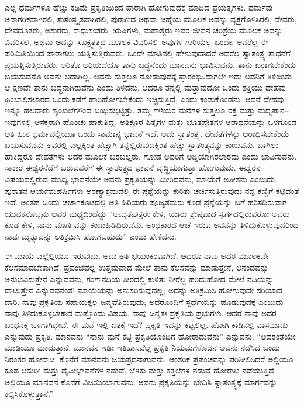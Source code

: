 \vskip 2pt

ಎಲ್ಲ ಧರ್ಮಗಳೂ ಹೆಚ್ಚು ಕಡಿಮೆ ಪ್ರಕೃತಿಯಿಂದ ಪಾರಾಗಿ ಹೋಗುವುದಕ್ಕೆ ಮಾಡಿದ ಪ್ರಯತ್ನಗಳು. ಧರ್ಮವು ಅನಾಗರಿಕವಾಗಿರಲಿ, ಸುಸಂಸ್ಕೃತವಾಗಿರಲಿ, ಪುರಾಣದ ಅಥವಾ ಚಿಹ್ನೆಯ ಮೂಲಕ ಅದನ್ನು ವ್ಯಕ್ತಗೊಳಿಸಿರಲಿ, ದೇವರು, ದೇವದೂತರು, ಅಸುರರು, ಸಾಧುಸಂತರು, ಋಷಿಗಳು, ಮಹಾತ್ಮರು ಇವರ ಜೀವನ ಚರಿತ್ರೆಯ ಮೂಲಕ ಅದನ್ನು ವಿವರಿಸಲಿ, ಅಥವಾ ಅದನ್ನು ಸೂಕ್ಷ್ಮತತ್ತ್ವದ ಮೂಲಕ ವಿವರಿಸಲಿ–ಅವುಗಳ ಗುರಿಯೆಲ್ಲ ಒಂದೇ. ಅವರೆಲ್ಲ ಈ ಪರಿಮಿತಿಯಿಂದ ಪಾರಾಗಲು ಯತ್ನಿಸುತ್ತಿರುವರು. ಒಂದೇ ಮಾತಿನಲ್ಲಿ ಹೇಳುವುದಾದರೆ ಅವರೆಲ್ಲ ಸ್ವಾತಂತ್ರ್ಯ ಸಾಧನೆಗೆ ಪ್ರಯತ್ನಿಸುತ್ತಿರುವರು. ಅರಿತೊ ಅರಿಯದೆಯೊ ತಾನು ಬದ್ಧನೆಂದು ಮಾನವನು ಭಾವಿಸುವನು. ತಾನು ಏನಾಗಬೇಕೆಂದು ಬಯಸುವನೊ ಅವನು ಅದಾಗಿಲ್ಲ. ಅವನು ಸುತ್ತಲೂ ನೋಡುವುದಕ್ಕೆ ಪ್ರಾರಂಭಿಸಿದಾಗಲೇ ಇದು ಅವನಿಗೆ ತಿಳಿಯಿತು. ಆ ಕ್ಷಣವೇ ತಾನು ಬದ್ಧನಾಗಿರುವೆನು ಎಂದು ತಿಳಿದನು. ಆದರೂ ತನ್ನಲ್ಲಿ ಮತ್ತಾವುದೋ ಒಂದು ಶಕ್ತಿಯು ದೇಹವು ಹಿಂಬಾಲಿಸಲಾರದ ಒಂದು ಕಡೆಗೆ ಹಾರಿಹೋಗಬೇಕೆಂದು ಇಚ್ಛಿಸುತ್ತಿದೆ, ಎಂದು ಕಂಡುಕೊಂಡನು. ಆದರೆ ದೇಹವು ಇನ್ನೂ ಹಲವಾರು ಶೃಂಖಲೆಗಳಿಂದ ಬಂಧಿಸಲ್ಪಟ್ಟಿತ್ತು. ತಮ್ಮ ಗೆಳೆಯರ ಮನೆಗಳ ಸುತ್ತಲೂ ರಕ್ತ ಮತ್ತು ಮದ್ಯಪಾನ–ಇವುಗಳಲ್ಲಿ ಆಸಕ್ತರಾಗಿ ಹೊಂಚು ಹಾಕುತ್ತಿದ್ದ, ಅತಿಕ್ರೂರ ಪಿತೃಗಳ ಮತ್ತು ಭೂತಪ್ರೇತಗಳ ಆರಾಧನೆಯನ್ನು ಒಳಗೊಂಡ ಅತಿ ಹೀನ ಧರ್ಮದಲ್ಲಿಯೂ ಒಂದು ಸಾಮಾನ್ಯ ಭಾವನೆ ಇದೆ. ಅದು ಸ್ವಾತಂತ್ರ್ಯ. ದೇವತೆಗಳನ್ನು ಆರಾಧಿಸಬೇಕೆಂದು ಬಯಸುವವನು ಅವರಲ್ಲಿ ಎಲ್ಲಕ್ಕಿಂತ ಹೆಚ್ಚಾಗಿ ತನ್ನಲ್ಲಿರುವುದಕ್ಕಿಂತ ಹೆಚ್ಚು ಸ್ವಾತಂತ್ರ್ಯವನ್ನು ಕಾಣುವನು. ಬಾಗಿಲು ಹಾಕಿದ್ದರೂ ದೇವತೆಗಳು ಅದರ ಮೂಲಕ ಬರಬಲ್ಲರು, ಗೋಡೆ ಅವರಿಗೆ ಅಡ್ಡಿಯಾಗಿರಲಾರದು ಎಂದು ಭಾವಿಸುವನು. ಸಾಕಾರ ಈಶ್ವರನೆಡೆಗೆ ಬರುವವರೆಗೆ ಈ ಸ್ವಾತಂತ್ರ್ಯದ ಭಾವನೆ ವೃದ್ಧಿಯಾಗುತ್ತಾ ಹೋಗುವುದು. ಈಶ್ವರನ ವಿಷಯದಲ್ಲಿರುವ ಮುಖ್ಯ ಭಾವನೆಯೇ ಅವನು ಪ್ರಕೃತಿಯನ್ನು ಮೀರಿದವನು, ಮಾಯೆಗೆ ಅತೀತನು ಎಂಬುದು. ಪುರಾತನ ಆರ್ಯಮಹರ್ಷಿಗಳು ಅರಣ್ಯಾಶ್ರಮದಲ್ಲಿ ಈ ಪ್ರಶ್ನೆಯನ್ನು ಕುರಿತು ಚರ್ಚಿಸುತ್ತಿರುವುದು ನನ್ನ ಕಣ್ಣಿಗೆ ಕಟ್ಟಿದಂತೆ ಇದೆ. ಅಂತಹ ಒಂದು ಚರ್ಚಾಕೂಟದಲ್ಲಿ ಅತಿ ಹಿರಿಯರು ಪೂಜ್ಯತಮರು ಕೂಡ ಪ್ರಶ್ನೆಯನ್ನು ಬಗೆ ಹರಿಸದಿರುವಾಗ ಯುವಕನೊಬ್ಬನು ಅವರ ಮಧ್ಯದಿಂದೆದ್ದು “ಅಮೃತಪುತ್ರರೇ ಕೇಳಿ, ಯಾರು ಶ್ರೇಷ್ಠವಾದ ಸ್ವರ್ಗದಲ್ಲಿರುವರೋ ಅವರು ಕೂಡ ಕೇಳಿ, ನಾನು ಮಾರ್ಗವನ್ನು ಕಂಡುಹಿಡಿದಿರುವೆನು. ಅಂಧಕಾರದ ಆಚೆ ಇರುವ ಅವನನ್ನು ತಿಳಿದುಕೊಳ್ಳುವುದರಿಂದ ನಾವು ಮೃತ್ಯುವನ್ನು ಅತಿಕ್ರಮಿಸಿ ಹೋಗಬಹುದು” ಎಂದು ಹೇಳಿದನು.

\vskip 2pt

ಈ ಮಾಯೆ ಎಲ್ಲೆಲ್ಲಿಯೂ ಇರುವುದು. ಅದು ಅತಿ ಭಯಂಕರವಾಗಿದೆ. ಆದರೂ ನಾವು ಅದರ ಮೂಲಕವೇ ಕೆಲಸಮಾಡಬೇಕಾಗಿದೆ. ಪ್ರಪಂಚವೆಲ್ಲ ಉತ್ತಮವಾದ ಮೇಲೆ ತಾನು ಕೆಲಸವನ್ನು ಮಾಡುತ್ತೇನೆ, ಆನಂದವನ್ನು ಅನುಭವಿಸುತ್ತೇನೆ ಎನ್ನುವವನು, ಗಂಗಾನದಿಯ ತೀರದಲ್ಲಿ ಕುಳಿತು ನೀರೆಲ್ಲ ಹರಿದುಹೋದ ಮೇಲೆ ನದಿಯನ್ನು ದಾಟುತ್ತೇನೆ ಎನ್ನುವವನಂತೆ! ಮಾಯೆಯನ್ನು ಅನುಸರಿಸುವುದಲ್ಲ; ಅದನ್ನು ಅತಿಕ್ರಮಿಸಿ ಹೋಗುವುದೇ ಸರಿಯಾದ ದಾರಿ. ನಾವು ಪ್ರಕೃತಿಯ ಸಹಾಯಕ್ಕಲ್ಲ ಜನ್ಮವೆತ್ತಿರುವುದು; ಅದರೊಂದಿಗೆ ಸ್ಪರ್ಧೆಯನ್ನು ಹೂಡುವುದಕ್ಕೆ ಎಂಬುದು ನಾವು ತಿಳಿದುಕೊಳ್ಳಬೇಕಾದ ಮತ್ತೊಂದು ವಿಷಯ. ನಾವು ಜನ್ಮತಃ ಪ್ರಕೃತಿಯ ಪ್ರಭುಗಳು. ಆದರೆ ನಾವು ಅದರ ಬಂಧನಕ್ಕೆ ಒಳಗಾಗಿದ್ದೇವೆ. ಈ ಮನೆ ಇಲ್ಲಿ ಏತಕ್ಕೆ ಇದೆ? ಪ್ರಕೃತಿ ಇದನ್ನು ಕಟ್ಟಲಿಲ್ಲ. ಹೋಗಿ ಕಾಡಿನಲ್ಲಿ ವಾಸಮಾಡು ಎನ್ನುವುದು ಪ್ರಕೃತಿ. ಮಾನವನು “ನಾನು ಮನೆ ಕಟ್ಟಿ ಪ್ರಕೃತಿಯೊಂದಿಗೆ ಹೋರಾಡುವೆನು” ಎನ್ನುವನು. “ಅದರಂತೆಯೇ ಮಾಡಿಯೂ ಮಾಡುತ್ತಾನೆ. ಮಾನವನ ಇಡೀ ಇತಿಹಾಸವೆಲ್ಲ ಪ್ರಕೃತಿ ನಿಯಮಗಳೊಡನೆ ಅವನು ನಡೆಸಿದ ಒಂದು ನಿರಂತರ ಹೋರಾಟ. ಕೊನೆಗೆ ಮಾನವನು ಜಯಪ್ರದನಾಗುವನು. ಆಂತರಿಕ ಪ್ರಪಂಚವನ್ನು ಪರಿಶೀಲಿಸಿದರೆ ಅಲ್ಲಿಯೂ ಕೂಡ ಆಸುರೀ ಮತ್ತು ದೈವೀಭಾವನೆಗಳ ನಡುವೆ, ಬೆಳಕು ಮತ್ತು ಕತ್ತಲೆಗಳ ನಡುವೆ ಹೋರಾಟ ನಡೆಯುತ್ತಿದೆ. ಅಲ್ಲಿಯೂ ಮಾನವನೆ ಕೊನೆಗೆ ವಿಜಯಿಯಾಗುವನು. ಅವನು ಪ್ರಕೃತಿಯನ್ನು ಭೇದಿಸಿ ಸ್ವಾತಂತ್ರ್ಯಕ್ಕೆ ಮಾರ್ಗವನ್ನು ಕಲ್ಪಿಸಿಕೊಳ್ಳುತ್ತಾನೆ.”

